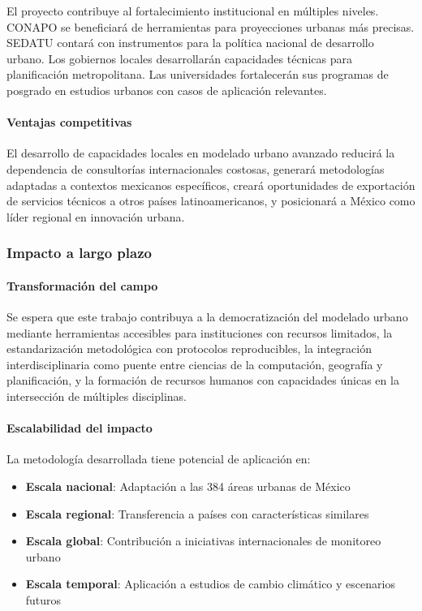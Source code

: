 El proyecto contribuye al fortalecimiento institucional en múltiples niveles. CONAPO se beneficiará de herramientas para proyecciones urbanas más precisas. SEDATU contará con instrumentos para la política nacional de desarrollo urbano. Los gobiernos locales desarrollarán capacidades técnicas para planificación metropolitana. Las universidades fortalecerán sus programas de posgrado en estudios urbanos con casos de aplicación relevantes.

\paragraph{Ventajas competitivas}

El desarrollo de capacidades locales en modelado urbano avanzado reducirá la dependencia de consultorías internacionales costosas, generará metodologías adaptadas a contextos mexicanos específicos, creará oportunidades de exportación de servicios técnicos a otros países latinoamericanos, y posicionará a México como líder regional en innovación urbana.

\subsubsection{Impacto a largo plazo}

\paragraph{Transformación del campo}

Se espera que este trabajo contribuya a la democratización del modelado urbano mediante herramientas accesibles para instituciones con recursos limitados, la estandarización metodológica con protocolos reproducibles, la integración interdisciplinaria como puente entre ciencias de la computación, geografía y planificación, y la formación de recursos humanos con capacidades únicas en la intersección de múltiples disciplinas.

\paragraph{Escalabilidad del impacto}

La metodología desarrollada tiene potencial de aplicación en:

\begin{itemize}
	\item \textbf{Escala nacional}: Adaptación a las 384 áreas urbanas de México
	\item \textbf{Escala regional}: Transferencia a países con características similares
	\item \textbf{Escala global}: Contribución a iniciativas internacionales de monitoreo urbano
	\item \textbf{Escala temporal}: Aplicación a estudios de cambio climático y escenarios futuros
\end{itemize}

